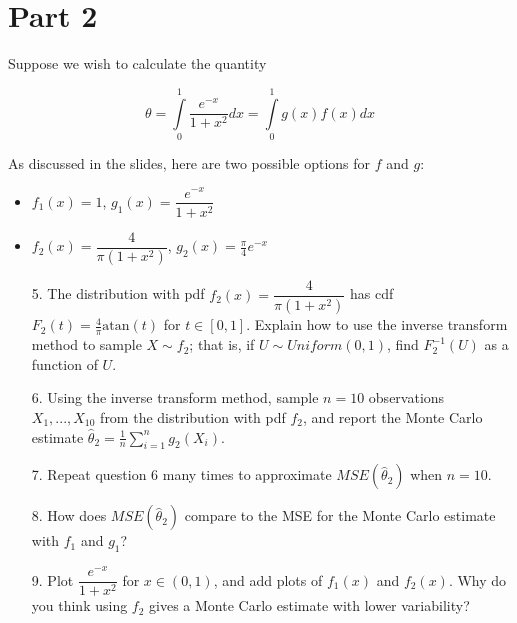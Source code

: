\documentclass[12pt]{article}
\begin{document}
\newpage

\section*{Part 2}

Suppose we wish to calculate the quantity

$$\theta = \int \limits_0^1 \dfrac{e^{-x}}{1 + x^2} dx = \int \limits_0^1 g(x) f(x) dx$$

As discussed in the slides, here are two possible options for $f$ and $g$:

\begin{itemize}
\item $f_1(x) = 1$, $g_1(x) = \dfrac{e^{-x}}{1 + x^2}$
\item $f_2(x) = \dfrac{4}{\pi(1 + x^2)}$, $g_2(x) = \frac{\pi}{4} e^{-x}$
\end{itemize}

\bigskip

\begin{enumerate}
\item[5.] The distribution with pdf $f_2(x) = \dfrac{4}{\pi(1 + x^2)}$ has cdf $F_2(t) = \frac{4}{\pi} \text{atan}(t)$ for $t \in [0, 1]$. Explain how to use the inverse transform method to sample $X \sim f_2$; that is, if $U \sim Uniform(0, 1)$, find $F_2^{-1}(U)$ as a function of $U$.

\vspace{7cm}

\item[6.] Using the inverse transform method, sample $n=10$ observations $X_1,...,X_{10}$ from the distribution with pdf $f_2$, and report the Monte Carlo estimate $\widehat{\theta}_2 = \frac{1}{n} \sum \limits_{i=1}^n g_2(X_i)$.

\newpage

\item[7.] Repeat question 6 many times to approximate $MSE(\widehat{\theta}_2)$ when $n = 10$.

\vspace{3cm}

\item[8.] How does $MSE(\widehat{\theta}_2)$ compare to the MSE for the Monte Carlo estimate with $f_1$ and $g_1$?

\vspace{3cm}

\item[9.] Plot $\dfrac{e^{-x}}{1 + x^2}$ for $x \in (0, 1)$, and add plots of $f_1(x)$ and $f_2(x)$. Why do you think using $f_2$ gives a Monte Carlo estimate with lower variability?

\end{enumerate}
\end{document}
